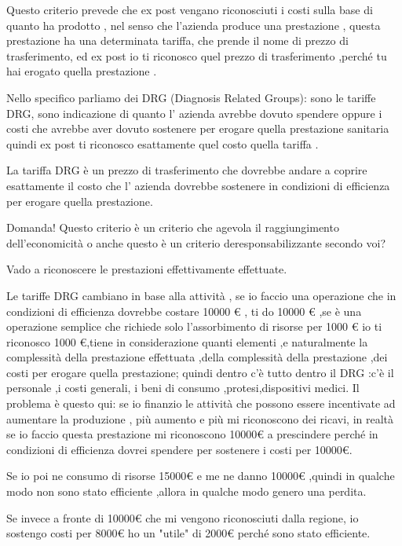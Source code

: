 \documentclass[]{article}
\newcommand{\euro}{€}
\begin{document}
Questo criterio prevede che ex post vengano riconosciuti i costi sulla
base di quanto ha prodotto , nel senso che l'azienda produce una
prestazione , questa prestazione ha una determinata tariffa, che prende
il nome di prezzo di trasferimento, ed ex post io ti riconosco quel
prezzo di trasferimento ,perché tu hai erogato quella prestazione .

Nello specifico parliamo dei DRG (Diagnosis Related Groups): sono le
tariffe DRG, sono indicazione di quanto l' azienda avrebbe dovuto
spendere oppure i costi che avrebbe aver dovuto sostenere per erogare
quella prestazione sanitaria quindi ex post ti riconosco esattamente
quel costo quella tariffa .

La tariffa DRG è un prezzo di trasferimento che dovrebbe andare a
coprire esattamente il costo che l' azienda dovrebbe sostenere in
condizioni di efficienza per erogare quella prestazione.

Domanda! Questo criterio è un criterio che agevola il raggiungimento
dell'economicità o anche questo è un criterio deresponsabilizzante
secondo voi?

Vado a riconoscere le prestazioni effettivamente effettuate.

Le tariffe DRG cambiano in base alla attività , se io faccio una
operazione che in condizioni di efficienza dovrebbe costare 10000
\euro{} , ti do 10000 \euro{} ,se è una operazione semplice che richiede
solo l'assorbimento di risorse per 1000 \euro{} io ti riconosco 1000
\euro{},tiene in considerazione quanti elementi ,e naturalmente la
complessità della prestazione effettuata ,della complessità della
prestazione ,dei costi per erogare quella prestazione; quindi dentro c'è
tutto dentro il DRG :c'è il personale ,i costi generali, i beni di
consumo ,protesi,dispositivi medici. Il problema è questo qui: se io
finanzio le attività che possono essere incentivate ad aumentare la
produzione , più aumento e più mi riconoscono dei ricavi, in realtà se
io faccio questa prestazione mi riconoscono 10000\euro{} a prescindere
perché in condizioni di efficienza dovrei spendere per sostenere i costi
per 10000\euro{}.

Se io poi ne consumo di risorse 15000\euro{} e me ne danno 10000\euro{}
,quindi in qualche modo non sono stato efficiente ,allora in qualche
modo genero una perdita.

Se invece a fronte di 10000\euro{} che mi vengono riconosciuti dalla
regione, io sostengo costi per 8000\euro{} ho un "utile" di 2000\euro{}
perché sono stato efficiente.
\end{document}
